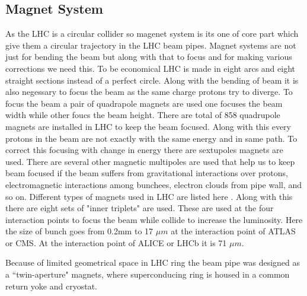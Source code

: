 \subsection{Magnet System}
As the LHC is a circular collider so magenet system is its one of core part which give them a circular trajectory in the LHC beam pipes. Magnet systems are not just for bending the beam but along with that to focus and for making various corrections we need this. To be economical LHC is made in eight arcs and eight straight sections instead of a perfect circle. Along with the bending of beam it is also negessary to focus the beam as the same charge protons try to diverge. To focus the beam a pair of quadrapole magnets are used one focuses the beam width while other foucs the beam height. There are total of 858 quadrupole magnets are installed in LHC to keep the beam focused. Along with this every protons in the beam are not exactly with the same energy and in same path. To correct this focusing with change in energy there are sextupoles magnets are used. There are several other magnetic multipoles are used that help us to keep beam focused if the beam suffers from gravitational interactions over protons, electromagnetic interactions among bunchees, electron clouds from pipe wall, and so on. Different types of magnets used in LHC are listed here \cite{WebLink:LHC_magnets}. Along with this there are eight sets of "inner triplets" are used. These are used at the four interaction points to focus the beam while collide to increase the luminosity. Here the size of bunch goes from 0.2mm to 17 $\mu m$ at the interaction point of ATLAS or CMS. At the interaction point of ALICE or LHCb it is 71 $\mu m$.


Because of limited geometrical space in LHC ring the beam pipe was designed as a ``twin-aperture" magnets, where superconducing ring is housed in a common return yoke and cryostat.


